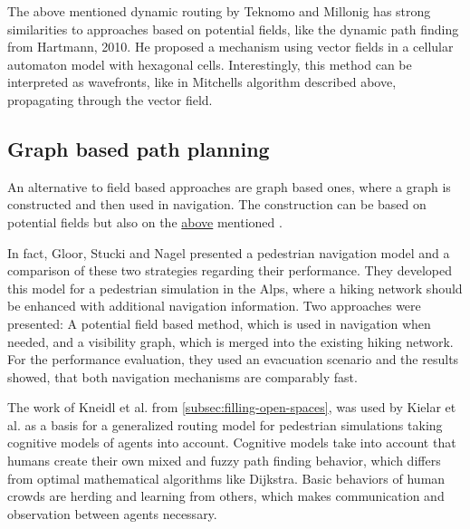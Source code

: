 		The above mentioned dynamic routing by Teknomo and Millonig has strong similarities to approaches based on potential fields, like the dynamic path finding from Hartmann, 2010\cite{hartmann-geodesic}.
		He proposed a mechanism using vector fields in a cellular automaton model with hexagonal cells.
		Interestingly, this method can be interpreted as wavefronts, like in Mitchells algorithm described above, propagating through the vector field.
			
	\subsection{Graph based path planning}
	
		An alternative to field based approaches are graph based ones, where a graph is constructed and then used in navigation.
		The construction can be based on potential fields but also on the \hyperref[subsec:related-work:visibility-graph]{above} mentioned .
		
		In fact, Gloor, Stucki and Nagel presented a pedestrian navigation model and a comparison of these two strategies regarding their performance\cite{gloor-hybrid-pedestrian-routing}.
		They developed this model for a pedestrian simulation in the Alps, where a hiking network should be enhanced with additional navigation information.
		Two approaches were presented: A potential field based method, which is used in navigation when needed, and a visibility graph, which is merged into the existing hiking network.
		For the performance evaluation, they used an evacuation scenario and the results showed, that both navigation mechanisms are comparably fast.
		
		The work of Kneidl et al. from \cref{subsec:filling-open-spaces}, was used by Kielar et al. as a basis for a generalized routing model for pedestrian simulations \cite{kielar-unified-pedestrian-routing} taking cognitive models of agents into account.
		Cognitive models take into account that humans create their own mixed and fuzzy path finding behavior, which differs from optimal mathematical algorithms like Dijkstra.
		Basic behaviors of human crowds are herding and learning from others, which makes communication and observation between agents necessary.
		
		